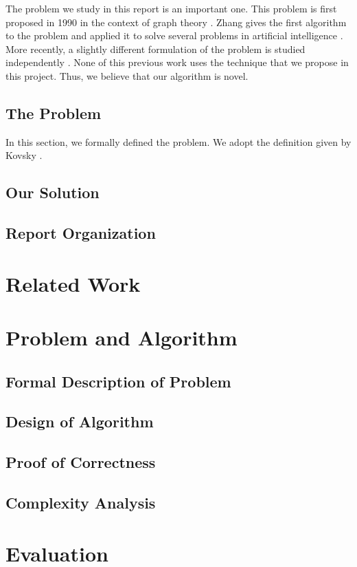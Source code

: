 \documentclass[fyp]{socreport}
\begin{document}
The problem we study in this report is an important one.
This problem is first proposed in 1990 in the context
of graph theory \cite{smith90graph}.  Zhang gives the
first algorithm to the problem and applied it to solve several 
problems in artificial intelligence \cite{zhang91ai,zhang92ai}.  
More recently, a slightly different formulation of the problem
is studied independently \cite{kovsky92diff,ali94diff}.  None of this previous work
uses the technique that we propose in this project.  Thus, we 
believe that our algorithm is novel.

\section{The Problem}
In this section, we formally defined the problem.  We adopt
the definition given by Kovsky \cite{kovsky92diff}.

\section{Our Solution}
\section{Report Organization}

\chapter{Related Work}
\label{ch:related}

\chapter{Problem and Algorithm}
\section{Formal Description of Problem}
\section{Design of Algorithm}
\section{Proof of Correctness}
\section{Complexity Analysis}

\chapter{Evaluation}
\end{document}
